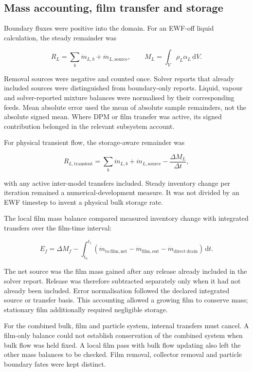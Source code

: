 \subsection{Mass accounting, film transfer and storage}

Boundary fluxes were positive into the domain. For an EWF-off liquid calculation, the steady remainder was

\[R_L=\sum_b\dot m_{L,b}+\dot m_{L,\mathrm{source}},\qquad M_L=\int_V\rho_L\alpha_L\,\mathrm dV.\]

Removal sources were negative and counted once. Solver reports that already included sources were distinguished from boundary-only reports. Liquid, vapour and solver-reported mixture balances were normalised by their corresponding feeds. Mean absolute error used the mean of absolute sample remainders, not the absolute signed mean. Where DPM or film transfer was active, its signed contribution belonged in the relevant subsystem account.

For physical transient flow, the storage-aware remainder was

\[R_{L,\mathrm{transient}}=\sum_b\dot m_{L,b}+\dot m_{L,\mathrm{source}}-\frac{\Delta M_L}{\Delta t},\]

with any active inter-model transfers included. Steady inventory change per iteration remained a numerical-development measure. It was not divided by an EWF timestep to invent a physical bulk storage rate.

The local film mass balance compared measured inventory change with integrated transfers over the film-time interval:

\[E_f=\Delta M_f-\int_{t_0}^{t_1}\left(\dot m_{\mathrm{to\ film,net}}-\dot m_{\mathrm{film,out}}-\dot m_{\mathrm{direct\ drain}}\right)\,\mathrm dt.\]

The net source was the film mass gained after any release already included in the solver report. Release was therefore subtracted separately only when it had not already been included. Error normalisation followed the declared integrated source or transfer basis. This accounting allowed a growing film to conserve mass; stationary film additionally required negligible storage.

For the combined bulk, film and particle system, internal transfers must cancel. A film-only balance could not establish conservation of the combined system when bulk flow was held fixed. A local film pass with bulk flow updating also left the other mass balances to be checked. Film removal, collector removal and particle boundary fates were kept distinct.

